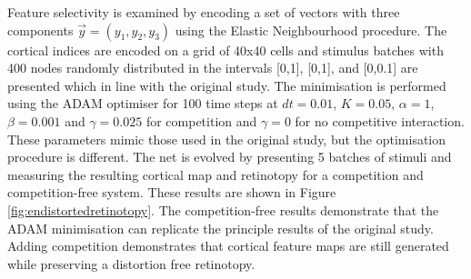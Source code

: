 Feature selectivity is examined by encoding a set of vectors with three components $\vec{y} = (y_1,y_2,y_3)$ using the Elastic Neighbourhood procedure. The cortical indices are encoded on a grid of 40x40 cells and stimulus batches with 400 nodes randomly distributed in the intervals [0,1], [0,1], and [0,0.1] are presented which in line with the original study. The minimisation is performed using the ADAM optimiser for 100 time steps at $dt = 0.01$, $K = 0.05$, $\alpha = 1$, $\beta = 0.001$ and $\gamma = 0.025$ for competition and $\gamma = 0$ for no competitive interaction. These parameters mimic those used in the original study, but the optimisation procedure is different. The net is evolved by presenting 5 batches of stimuli and measuring the resulting cortical map and retinotopy for a competition and competition-free system. These results are shown in Figure \ref{fig:endistortedretinotopy}. The competition-free results demonstrate that the ADAM minimisation can replicate the principle results of the original study. Adding competition demonstrates that cortical feature maps are still generated while preserving a distortion free retinotopy.
